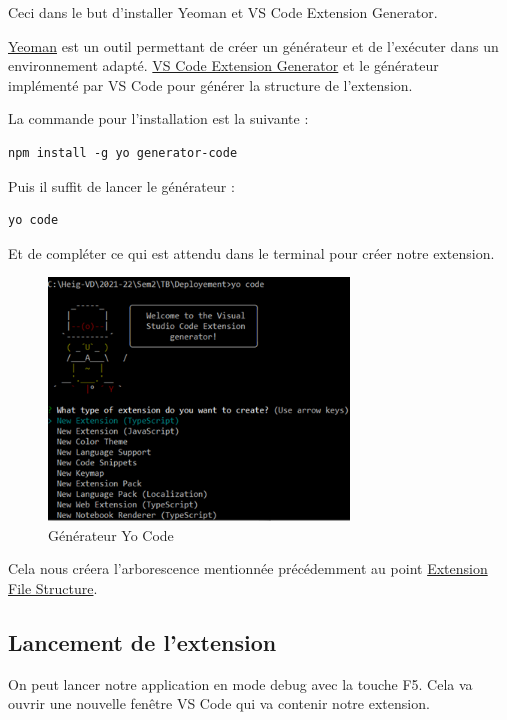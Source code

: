 \documentclass[
    iict, %
    il, %
]{heig-tb}
\begin{document}
Ceci dans le but d'installer Yeoman et VS Code Extension Generator.

\href{https://yeoman.io/}{Yeoman} est un outil permettant de créer un générateur et de l'exécuter dans un environnement adapté.
\href{https://www.npmjs.com/package/generator-code}{VS Code Extension Generator} et le générateur implémenté par VS Code pour générer la structure de l'extension.

La commande pour l'installation est la suivante :

\begin{lstlisting}[frame=single]
npm install -g yo generator-code
\end{lstlisting}

Puis il suffit de lancer le générateur :

\begin{lstlisting}[frame=single]
yo code
\end{lstlisting}

Et de compléter ce qui est attendu dans le terminal pour créer notre extension.

\begin{figure}[!h]
    \begin{center}
        \includegraphics[width=8cm]{assets/figures/yo-code.png}
    \end{center}
    \caption[Générateur Yo Code]{\label{yo-code}Générateur Yo Code}
\end{figure}

Cela nous créera l'arborescence mentionnée précédemment au point \hyperref[Extension File Structure]{Extension File Structure}.

\subsection{Lancement de l'extension}
On peut lancer notre application en mode debug avec la touche F5. Cela va ouvrir une nouvelle fenêtre VS Code qui va contenir notre extension.
\end{document}
